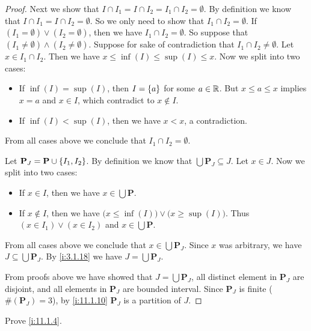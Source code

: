 \begin{proof}
  Next we show that \(I \cap I_1 = I \cap I_2 = I_1 \cap I_2 = \emptyset\).
  By definition we know that \(I \cap I_1 = I \cap I_2 = \emptyset\).
  So we only need to show that \(I_1 \cap I_2 = \emptyset\).
  If \((I_1 = \emptyset) \lor (I_2 = \emptyset)\), then we have \(I_1 \cap I_2 = \emptyset\).
  So suppose that \((I_1 \neq \emptyset) \land (I_2 \neq \emptyset)\).
  Suppose for sake of contradiction that \(I_1 \cap I_2 \neq \emptyset\).
  Let \(x \in I_1 \cap I_2\).
  Then we have \(x \leq \inf(I) \leq \sup(I) \leq x\).
  Now we split into two cases:
  \begin{itemize}
    \item If \(\inf(I) = \sup(I)\), then \(I = \left\lbrace a\right\rbrace\) for some \(a \in \mathbb{R}\).
          But \(x \leq a \leq x\) implies \(x = a\) and \(x \in I\), which contradict to \(x \notin I\).
    \item If \(\inf(I) < \sup(I)\), then we have \(x < x\), a contradiction.
  \end{itemize}
  From all cases above we conclude that \(I_1 \cap I_2 = \emptyset\).

  Let \(\mathbf{P}_J = \mathbf{P} \cup \left\lbrace I_1, I_2\right\rbrace\).
  By definition we know that \(\bigcup \mathbf{P}_J \subseteq J\).
  Let \(x \in J\).
  Now we split into two cases:
  \begin{itemize}
    \item If \(x \in I\), then we have \(x \in \bigcup \mathbf{P}\).
    \item If \(x \notin I\), then we have \(\big(x \leq \inf(I)\big) \lor \big(x \geq \sup(I)\big)\).
          Thus \((x \in I_1) \lor (x \in I_2)\) and \(x \in \bigcup \mathbf{P}\).
  \end{itemize}
  From all cases above we conclude that \(x \in \bigcup \mathbf{P}_J\).
  Since \(x\) was arbitrary, we have \(J \subseteq \bigcup \mathbf{P}_J\).
  By \cref{i:3.1.18} we have \(J = \bigcup \mathbf{P}_J\).

  From proofs above we have showed that \(J = \bigcup \mathbf{P}_J\), all distinct element in \(\mathbf{P}_J\) are disjoint, and all elements in \(\mathbf{P}_J\) are bounded interval.
  Since \(\mathbf{P}_J\) is finite (\(\#(\mathbf{P}_J) = 3\)), by \cref{i:11.1.10} \(\mathbf{P}_J\) is a partition of \(J\).
\end{proof}

\exercisesection

\begin{ex}\label{i:ex:11.1.1}
  Prove \cref{i:11.1.4}.
\end{ex}

